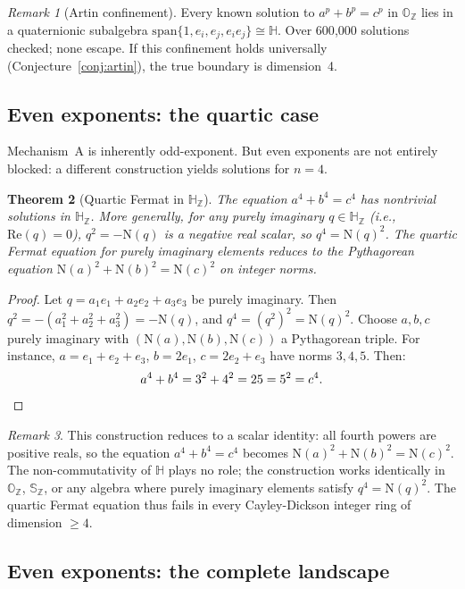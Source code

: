 \documentclass[11pt]{amsart}
\theoremstyle{plain}
\newtheorem{theorem}{Theorem}[section]
\theoremstyle{definition}
\theoremstyle{remark}
\newtheorem{remark}[theorem]{Remark}
\newcommand{\Z}{\mathbb{Z}}
\newcommand{\HH}{\mathbb{H}}
\newcommand{\OO}{\mathbb{O}}
\newcommand{\Se}{\mathbb{S}}
\newcommand{\Norm}[1]{\mathrm{N}(#1)}
\begin{document}
\begin{remark}[Artin confinement]
Every known solution to $a^p + b^p = c^p$ in $\OO_\Z$ lies in a quaternionic
subalgebra $\mathrm{span}\{1, e_i, e_j, e_i e_j\} \cong \HH$.
Over 600{,}000 solutions checked; none escape.
If this confinement holds universally (Conjecture~\ref{conj:artin}),
the true boundary is dimension~4.
\end{remark}

\subsection{Even exponents: the quartic case}

Mechanism~A is inherently odd-exponent. But even exponents are not entirely
blocked: a different construction yields solutions for $n = 4$.

\begin{theorem}[Quartic Fermat in $\HH_\Z$]\label{thm:quartic}
The equation $a^4 + b^4 = c^4$ has nontrivial solutions in $\HH_\Z$.
More generally, for any purely imaginary $q \in \HH_\Z$ (i.e., $\mathrm{Re}(q) = 0$),
$q^2 = -\Norm{q}$ is a negative real scalar, so $q^4 = \Norm{q}^2$.
The quartic Fermat equation for purely imaginary elements reduces to the
Pythagorean equation $\Norm{a}^2 + \Norm{b}^2 = \Norm{c}^2$ on integer norms.
\end{theorem}

\begin{proof}
Let $q = a_1 e_1 + a_2 e_2 + a_3 e_3$ be purely imaginary.
Then $q^2 = -(a_1^2 + a_2^2 + a_3^2) = -\Norm{q}$, and $q^4 = (q^2)^2 = \Norm{q}^2$.
Choose $a, b, c$ purely imaginary with
$(\Norm{a}, \Norm{b}, \Norm{c})$ a Pythagorean triple.
For instance, $a = e_1 + e_2 + e_3$, $b = 2e_1$, $c = 2e_2 + e_3$
have norms $3, 4, 5$.
Then:
\[
  a^4 + b^4 = 3^2 + 4^2 = 25 = 5^2 = c^4. \qedhere
\]
\end{proof}

\begin{remark}
This construction reduces to a scalar identity: all fourth powers are
positive reals, so the equation $a^4 + b^4 = c^4$ becomes $\Norm{a}^2 + \Norm{b}^2 = \Norm{c}^2$.
The non-commutativity of $\HH$ plays no role; the construction works identically
in $\OO_\Z$, $\Se_\Z$, or any algebra where purely imaginary elements satisfy
$q^4 = \Norm{q}^2$.
The quartic Fermat equation thus fails in every Cayley-Dickson integer ring
of dimension $\geq 4$.
\end{remark}

\subsection{Even exponents: the complete landscape}
\end{document}

